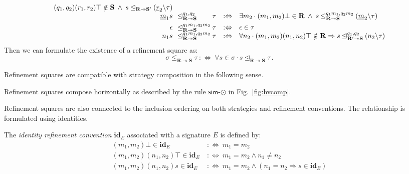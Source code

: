 \documentclass[acmsmall,screen,review,nonacm]{acmart}
\newcommand{\kw}[1]{\ensuremath{ \mathsf{#1} }}
\newcommand{\idsc}{\mathbf{id}} %
\begin{document}
\begin{definition}
\[\begin{array}{r@{\:\:\:}l@{\:}l@{\quad:\Leftrightarrow\quad}l}
      (q_1, q_2)(r_1, r_2)\top \notin \mathbf{S} \:\wedge\:
      s \unlhd_{\mathbf{R} \twoheadrightarrow \mathbf{S}'}
      (\underline{r}_2 \backslash \tau )
  \\
  \underline{m}_1 s &
  \unlhd_{\mathbf{R} \twoheadrightarrow \mathbf{S}}^{q_1,q_2} &
  \tau &
    \exists m_2 \cdot
      (m_1, m_2) \bot \in \mathbf{R} \:\wedge\:
      s \unlhd_{\mathbf{R} \twoheadrightarrow \mathbf{S}}^{q_1m_1,q_2m_2}
        (\underline{m}_2 \backslash \tau )
  \\[1ex]
  \epsilon &
  \unlhd_{\mathbf{R} \twoheadrightarrow \mathbf{S}}^{q_1m_1,q_2m_2} &
  \tau &
    \epsilon \in \tau
  \\
  n_1 s &
  \unlhd_{\mathbf{R} \twoheadrightarrow \mathbf{S}}^{q_1m_1,q_2m_2} &
  \tau &
    \forall n_2 \cdot
      (m_1,m_2)(n_1, n_2)\top \notin \mathbf{R} \Rightarrow
      s \unlhd_{\mathbf{R}' \twoheadrightarrow \mathbf{S}}^{q_1,q_2}
        (n_2 \backslash \tau)
\end{array}
\]
Then we can formulate the existence of a refinement square as:
\[
  \sigma \le_{\mathbf{R} \twoheadrightarrow \mathbf{S}} \tau
    \::\Leftrightarrow\:
  \forall s \in \sigma \cdot
    s \unlhd_{\mathbf{R} \twoheadrightarrow \mathbf{S}} \tau
  \,.
\]
\end{definition}

Refinement squares are compatible with strategy composition
in the following sense.

\begin{theorem}%
Refinement squares compose horizontally
as described by the rule $\kw{sim}$-$\odot$
in Fig.~\ref{fig:hvcomp}.
\end{theorem}

Refinement squares are also connected to
the inclusion ordering on both strategies and refinement conventions.
The relationship is formulated using identities.

\begin{definition}
The \emph{identity refinement convention} $\idsc_E$
associated with a signature $E$ is defined by:
\begin{align*}
  (m_1, m_2) \bot \in \idsc_E &\::\Leftrightarrow\:
    m_1 = m_2 \\
  (m_1, m_2) (n_1, n_2) \top \in \idsc_E &\::\Leftrightarrow\:
    m_1 = m_2 \wedge n_1 \neq n_2 \\
  (m_1, m_2) (n_1, n_2) s \in \idsc_E &\::\Leftrightarrow\:
    m_1 = m_2 \wedge (n_1 = n_2 \Rightarrow s \in \idsc_E)
\end{align*}
\end{definition}
\end{document}
